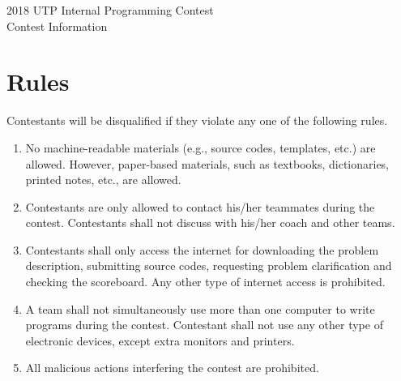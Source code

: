 \begin{center}
{\LARGE 2018 UTP Internal Programming Contest}\\
{\LARGE Contest Information}
\end{center}


\section*{Rules}
Contestants will be disqualified if they violate any one of the following rules.
\begin{enumerate}
\item No machine-readable materials (e.g., source codes, templates, etc.) are allowed. However, paper-based materials, such as textbooks, dictionaries, printed notes, etc., are allowed.
\item Contestants are only allowed to contact his/her teammates during the contest. Contestants shall not discuss with his/her coach and other teams.
\item Contestants shall only access the internet for downloading the problem description, submitting source codes, requesting problem clarification and checking the scoreboard. Any other type of internet access is prohibited.
\item A team shall not simultaneously use more than one computer to write programs during the contest. Contestant shall not use any other type of electronic devices, except extra monitors and printers.
\item All malicious actions interfering the contest are prohibited.
\end{enumerate}

